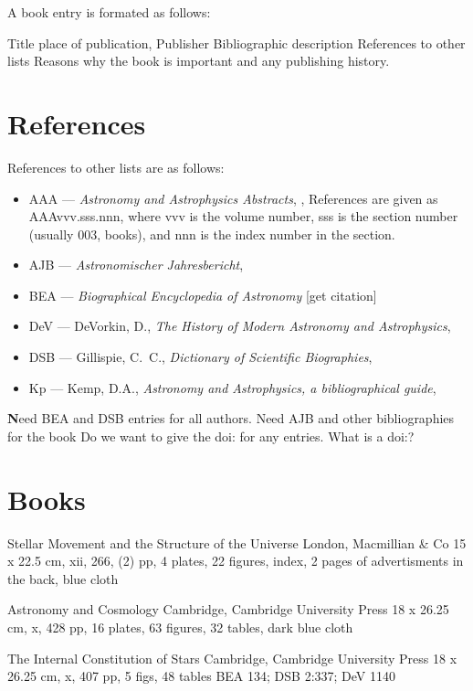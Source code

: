 A book entry is formated as follows:

{Title}
{place of publication, Publisher}
{Bibliographic description}
{References to other lists}
Reasons why the book is important and any publishing history.

\section*{References}
References to other lists are as follows:
\begin{itemize}
\item AAA --- \emph{Astronomy and Astrophysics Abstracts}, \cite{aaa:1969},
References are given as AAAvvv.sss.nnn, where vvv is the volume
number, sss is the section number (usually 003, books), and nnn is the
index number in the section.
\item AJB --- \emph{Astronomischer Jahresbericht}, \cite{ajb:1900}
\item BEA --- \emph{Biographical Encyclopedia of Astronomy} [get citation]
\item DeV --- DeVorkin, D., \emph{The History of Modern Astronomy and Astrophysics},
\cite{devorkin:1982}
\item DSB --- Gillispie, C.\ C., \emph{Dictionary of Scientific Biographies}, \cite{gillispie:1970}
\item Kp --- Kemp, D.A., \emph{Astronomy and Astrophysics, a bibliographical guide}, \cite{kemp:1970}
\end{itemize}

{\textbf Need BEA and DSB entries for all authors. Need AJB and other
bibliographies for the book Do we want to give the doi: for any
entries.  What is a doi:?}
\newpage

\section*{Books}
\setcounter{bksctr}{0}

{Stellar Movement and the Structure of the Universe}
{London, Macmillian \& Co}
{15 x 22.5 cm, xii, 266, (2) pp, 4 plates, 22
figures, index, 2 pages of advertisments in the back, blue cloth}
{}

{Astronomy and Cosmology}
{Cambridge, Cambridge University Press}
{18 x 26.25 cm, x, 428 pp, 16 plates, 63 figures, 32 tables, dark blue cloth}
{}

{The Internal Constitution of Stars}
{Cambridge, Cambridge University Press}
{18 x 26.25 cm, x, 407 pp, 5 figs, 48 tables}
{BEA 134; DSB 2:337; DeV 1140}

